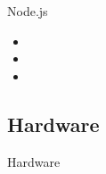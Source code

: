 \begin{frame}{Node.js}
      \begin{itemize}
        \item
        \item
        \item
      \end{itemize}
\end{frame}

\subsection{Hardware}
\begin{frame}{Hardware}

\end{frame}
